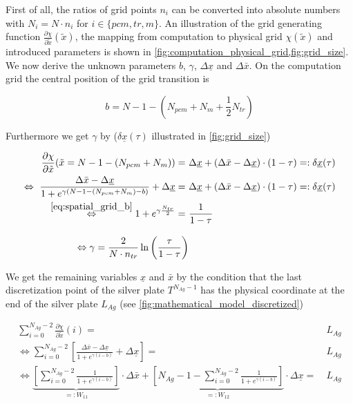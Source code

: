 \documentclass{scrartcl}[12pt, halfparskip]
\numberwithin{equation}{section}
\numberwithin{figure}{section}
\numberwithin{table}{section}
\begin{document}
First of all, the ratios of grid points $n_i$ can be converted into absolute numbers with $N_i = N \cdot n_i$ for $i \in \{ pcm, tr, m \}$. An illustration of the grid generating function $\frac{\partial \chi}{\partial \tilde{x}}(\tilde{x})$, the mapping from computation to physical grid $\chi(\tilde{x})$ and introduced parameters is shown in \cref{fig:computation_physical_grid,fig:grid_size}. \\
We now derive the unknown parameters $b$, $\gamma$, $\Delta \underline{x}$ and $\Delta \bar{x}$. On the computation grid the central position of the grid transition is

\begin{equation}
	b = N-1 - \left(N_{pcm} + N_m + \frac{1}{2} N_{tr} \right)
	\label{eq:spatial_grid_b}
\end{equation}

Furthermore we get $\gamma$ by ($\delta \underline{x}(\tau)$ illustrated in \cref{fig:grid_size})

\begin{subequations}
\begin{align}
	\frac{\partial \chi}{\partial \tilde{x}}(\tilde{x}=N-1-(N_{pcm}+N_m)) = \ & \Delta \underline{x} + (\Delta \bar{x} - \Delta \underline{x}) \cdot (1-\tau) =: \delta \underline{x}(\tau) \\
	\Leftrightarrow \ \frac{\Delta \bar{x} - \Delta \underline{x}}{1 + e^{\gamma(N-1-(N_{pcm}+N_m) - b)}} + \Delta \underline{x} = \ & \Delta \underline{x} + (\Delta \bar{x} - \Delta \underline{x}) \cdot (1-\tau) =: \delta \underline{x}(\tau)  \\
	\stackrel{\eqref{eq:spatial_grid_b}}{\Leftrightarrow}  1 + e^{\gamma \frac{N_{tr}}{2}} = \ & \frac{1}{1 - \tau}  \\[2ex]
	\Leftrightarrow \gamma = \frac{2}{N \cdot n_{tr}} \ln\left(\frac{\tau}{1-\tau}\right)
\end{align}
\end{subequations}

We get the remaining variables $\underline{x}$ and $\bar{x}$ by the condition that the last discretization point of the silver plate $T^{N_{Ag}-1}$ has the physical coordinate at the end of the silver plate $L_{Ag}$ (see \cref{fig:mathematical_model_discretized})

\begin{subequations}
	\begin{align}
	\sum_{i=0}^{N_{Ag} - 2} \frac{\partial \chi}{\partial \tilde{x}}(i) = \ & L_{Ag} \\
	\Leftrightarrow \sum_{i=0}^{N_{Ag} - 2} \left[ \frac{\Delta \bar{x} - \Delta \underline{x}}{1 + e^{\gamma(i - b)}} + \Delta \underline{x} \right] = \ & L_{Ag} \\
	\Leftrightarrow \underbrace{ \left[ \sum_{i=0}^{N_{Ag} - 2} \frac{1}{1 + e^{\gamma(i - b)}} \right] }_{=: W_{11}} \cdot \Delta \bar{x} + \underbrace{\left[ N_{Ag} - 1 - \sum_{i=0}^{N_{Ag} - 2} \frac{1}{1 + e^{\gamma(i - b)}} \right]}_{=: W_{12}} \cdot \Delta \underline{x} = \ & L_{Ag}
	\end{align}
\end{subequations}
\end{document}
